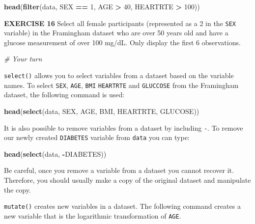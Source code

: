 \documentclass[
]{article}
\newenvironment{Shaded}{\begin{snugshade}}{\end{snugshade}}
\newcommand{\CommentTok}[1]{\textcolor[rgb]{0.56,0.35,0.01}{\textit{#1}}}
\newcommand{\DecValTok}[1]{\textcolor[rgb]{0.00,0.00,0.81}{#1}}
\newcommand{\KeywordTok}[1]{\textcolor[rgb]{0.13,0.29,0.53}{\textbf{#1}}}
\newcommand{\NormalTok}[1]{#1}
\newcommand{\OperatorTok}[1]{\textcolor[rgb]{0.81,0.36,0.00}{\textbf{#1}}}
\newcommand{\StringTok}[1]{\textcolor[rgb]{0.31,0.60,0.02}{#1}}
\begin{document}
\begin{Shaded}
\begin{Highlighting}[]
\KeywordTok{head}\NormalTok{(}\KeywordTok{filter}\NormalTok{(data, SEX }\OperatorTok{==}\StringTok{ }\DecValTok{1}\NormalTok{, AGE }\OperatorTok{>}\StringTok{ }\DecValTok{40}\NormalTok{, HEARTRTE }\OperatorTok{>}\StringTok{ }\DecValTok{100}\NormalTok{))}
\end{Highlighting}
\end{Shaded}

\textbf{EXERCISE 16} Select all female participants (represented as a 2
in the \texttt{SEX} variable) in the Framingham dataset who are over 50
years old and have a glucose measurement of over 100 mg/dL. Only display
the first 6 observations.

\begin{Shaded}
\begin{Highlighting}[]
\CommentTok{# Your turn}
\end{Highlighting}
\end{Shaded}

\texttt{select()} allows you to select variables from a dataset based on
the variable names. To select \texttt{SEX}, \texttt{AGE}, \texttt{BMI}
\texttt{HEARTRTE} and \texttt{GLUCCOSE} from the Framingham dataset, the
following command is used:

\begin{Shaded}
\begin{Highlighting}[]
\KeywordTok{head}\NormalTok{(}\KeywordTok{select}\NormalTok{(data, SEX, AGE, BMI, HEARTRTE, GLUCOSE))}
\end{Highlighting}
\end{Shaded}

It is also possible to remove variables from a dataset by including
\texttt{-}. To remove our newly created \texttt{DIABETES} variable from
\texttt{data} you can type:

\begin{Shaded}
\begin{Highlighting}[]
\KeywordTok{head}\NormalTok{(}\KeywordTok{select}\NormalTok{(data, }\OperatorTok{-}\NormalTok{DIABETES))}
\end{Highlighting}
\end{Shaded}

Be careful, once you remove a variable from a dataset you cannot recover
it. Therefore, you should usually make a copy of the original dataset
and manipulate the copy.

\texttt{mutate()} creates new variables in a dataset. The following
command creates a new variable that is the logarithmic transformation of
\texttt{AGE}.
\end{document}
